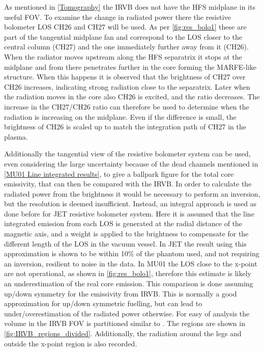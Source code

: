 As mentioned in \autoref{Tomography} the IRVB does not have the HFS midplane in its useful FOV. To examine the change in radiated power there the resistive bolometer LOS CH26 and CH27 will be used. As per \autoref{fig:res_bolo1} these are part of the tangential midplane fan and correspond to the LOS closer to the central column (CH27) and the one immediately further away from it (CH26). When the radiator moves upstream along the HFS separatrix it stops at the midplane and from there penetrates further in the core forming the MARFE-like structure. When this happens it is observed that the brightness of CH27 over CH26 increases, indicating strong radiation close to the separatrix. Later when the radiation moves in the core also CH26 is excited, and the ratio decreases. The increase in the CH27/CH26 ratio can therefore be used to determine when the radiation is increasing on the midplane. Even if the difference is small, the brightness of CH26 is scaled up to match the integration path of CH27 in the plasma.

Additionally the tangential view of the resistive bolometer system can be used, even considering the large uncertainty because of the dead channels mentioned in \autoref{MU01 Line integrated results}, to give a ballpark figure for the total core emissivity, that can then be compared with the IRVB. In order to calculate the radiated power from the brightness it would be necessary to perform an inversion, but the resolution is deemed insufficient. Instead, an integral approach is used as done before for JET resistive bolometer system.\cite{Ingesson2000} Here it is assumed that the line integrated emission from each LOS is generated at the radial distance of the magnetic axis, and a weight is applied to the brightness to compensate for the different length of the LOS in the vacuum vessel. In JET the result using this approximation is shown to be within 10\% of the phantom used, and not requiring an inversion, resilient to noise in the data. In MU01 the LOS close to the x-point are not operational, as shown in \autoref{fig:res_bolo1}, therefore this estimate is likely an underestimation of the real core emission. This comparison is done assuming up/down symmetry for the emissivity from IRVB. This is normally a good approximation for up/down symmetric fuelling, but can lead to under/overestimation of the radiated power otherwise.
For easy of analysis the volume in the IRVB FOV is partitioned similar to \cite{Harrison2017}. The regions are shown in \autoref{fig:IRVB_regions_divided}. Additionally, the radiation around the legs and outside the x-point region is also recorded.

